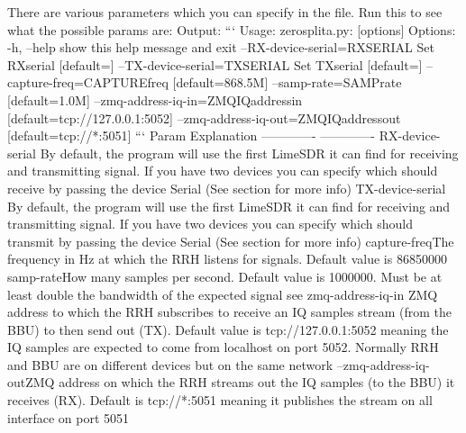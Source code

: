 {}There are various parameters which you can specify in the  file.\markdownRendererInterblockSeparator
{}Run this to see what the possible params are: \markdownRendererInterblockSeparator
{}Output: ``` Usage: zerosplit\markdownRendererUnderscore{}a.py: [options]\markdownRendererInterblockSeparator
{}Options: -h, --help show this help message and exit --RX-device-serial=RXSERIAL Set RXserial [default=] --TX-device-serial=TXSERIAL Set TXserial [default=] --capture-freq=CAPTUREfreq [default=868.5M] --samp-rate=SAMPrate [default=1.0M] --zmq-address-iq-in=ZMQIQaddressin [default=tcp://127.0.0.1:5052] --zmq-address-iq-out=ZMQIQaddressout [default=tcp://*:5051]\markdownRendererInterblockSeparator
{}```\markdownRendererInterblockSeparator
{}\markdownRendererPipe{} Param \markdownRendererPipe{} Explanation \markdownRendererPipe{} \markdownRendererPipe{} ------------- \markdownRendererPipe{} ------------- \markdownRendererPipe{} \markdownRendererPipe{} RX-device-serial \markdownRendererPipe{} By default, the program will use the first LimeSDR it can find for receiving and transmitting signal. If you have two devices you can specify which should receive by passing the device Serial (See section  for more info) \markdownRendererPipe{} \markdownRendererPipe{} TX-device-serial \markdownRendererPipe{} By default, the program will use the first LimeSDR it can find for receiving and transmitting signal. If you have two devices you can specify which should transmit by passing the device Serial (See section  for more info) \markdownRendererPipe{} \markdownRendererPipe{}capture-freq\markdownRendererPipe{}The frequency in Hz at which the RRH listens for signals. Default value is 86850000\markdownRendererPipe{} \markdownRendererPipe{}samp-rate\markdownRendererPipe{}How many samples per second. Default value is 1000000. Must be at least double the bandwidth of the expected signal see \markdownRendererPipe{} \markdownRendererPipe{}zmq-address-iq-in\markdownRendererPipe{} ZMQ address to which the RRH subscribes to receive an IQ samples stream (from the BBU) to then send out (TX). Default value is tcp://127.0.0.1:5052 meaning the IQ samples are expected to come from localhost on port 5052. Normally RRH and BBU are on different devices but on the same network \markdownRendererPipe{} \markdownRendererPipe{}--zmq-address-iq-out\markdownRendererPipe{}ZMQ address on which the RRH streams out the IQ samples (to the BBU) it receives (RX). Default is tcp://*:5051 meaning it publishes the stream on all interface on port 5051\markdownRendererPipe{}\markdownRendererInterblockSeparator
